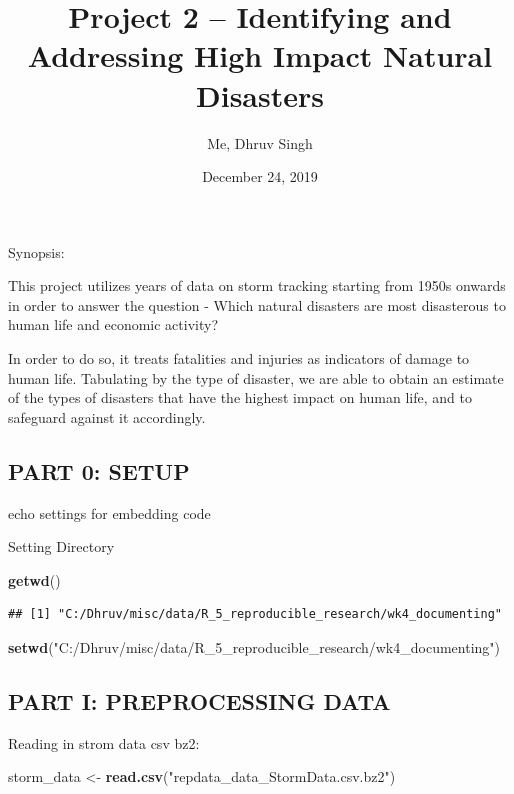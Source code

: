 \documentclass[]{article}
\title{Project 2 -- Identifying and Addressing High Impact Natural Disasters}
\author{Me, Dhruv Singh}
\date{December 24, 2019}
\newenvironment{Shaded}{\begin{snugshade}}{\end{snugshade}}
\newcommand{\KeywordTok}[1]{\textcolor[rgb]{0.13,0.29,0.53}{\textbf{#1}}}
\newcommand{\StringTok}[1]{\textcolor[rgb]{0.31,0.60,0.02}{#1}}
\newcommand{\NormalTok}[1]{#1}
\begin{document}
\maketitle

Synopsis:

This project utilizes years of data on storm tracking starting from
1950s onwards in order to answer the question - Which natural disasters
are most disasterous to human life and economic activity?

In order to do so, it treats fatalities and injuries as indicators of
damage to human life. Tabulating by the type of disaster, we are able to
obtain an estimate of the types of disasters that have the highest
impact on human life, and to safeguard against it accordingly.

\subsection{PART 0: SETUP}\label{part-0-setup}

echo settings for embedding code

Setting Directory

\begin{Shaded}
\begin{Highlighting}[]
\KeywordTok{getwd}\NormalTok{()}
\end{Highlighting}
\end{Shaded}

\begin{verbatim}
## [1] "C:/Dhruv/misc/data/R_5_reproducible_research/wk4_documenting"
\end{verbatim}

\begin{Shaded}
\begin{Highlighting}[]
\KeywordTok{setwd}\NormalTok{(}\StringTok{"C:/Dhruv/misc/data/R_5_reproducible_research/wk4_documenting"}\NormalTok{)}
\end{Highlighting}
\end{Shaded}

\subsection{PART I: PREPROCESSING DATA}\label{part-i-preprocessing-data}

Reading in strom data csv bz2:

\begin{Shaded}
\begin{Highlighting}[]
\NormalTok{storm_data <-}\StringTok{ }\KeywordTok{read.csv}\NormalTok{(}\StringTok{"repdata_data_StormData.csv.bz2"}\NormalTok{)}
\end{Highlighting}
\end{Shaded}
\end{document}
